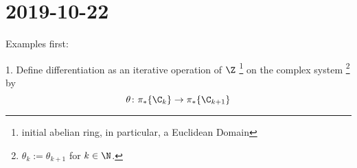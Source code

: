 \documentclass{ccg-notes}
\author{Colton Grainger}
\date{\today}
\begin{document}
\frontstuff

\section{2019-10-22}

Examples first:

1. Define differentiation as an iterative operation of $\Z$ 
    \footnote{%
        initial abelian ring, in particular, a Euclidean Domain
    }
on the complex system 
    \footnote{%
        $\theta_k := \theta_{k+1}$ for $k \in \N$.
    }
by 
\begin{equation}
    \label{e01}
    \theta \colon \pi_*\{\C_{k}\} \to \pi_*\{\C_{k+1}\}
\end{equation}
\end{document}
